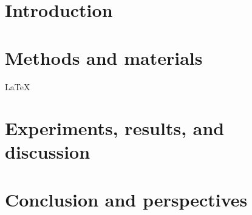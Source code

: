 \documentclass{article}
\begin{document}
    
    \tableofcontents
    \section{Introduction}
        
    \section{Methods and materials}
        \LaTeX{} \cite{molina:1982}
    \section{Experiments, results, and discussion}

    \section{Conclusion and perspectives}

\newpage
\end{document}
